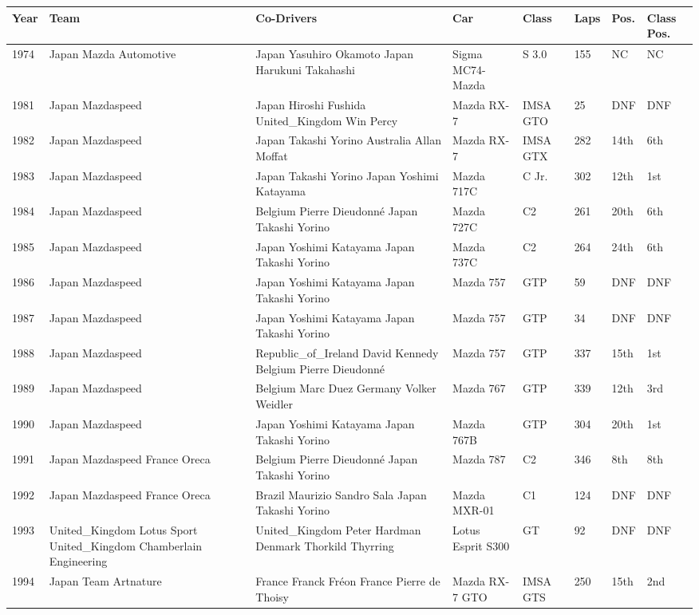 \documentclass{article}
\begin{document}
\begin{tabular}{llllllll}
\toprule
Year & Team & Co-Drivers & Car & Class & Laps & Pos. & Class Pos. \\
\midrule
1974 & Japan Mazda Automotive & Japan Yasuhiro Okamoto Japan Harukuni Takahashi & Sigma MC74-Mazda & S 3.0 & 155 & NC & NC \\
1981 & Japan Mazdaspeed & Japan Hiroshi Fushida United\_Kingdom Win Percy & Mazda RX-7 & IMSA GTO & 25 & DNF & DNF \\
1982 & Japan Mazdaspeed & Japan Takashi Yorino Australia Allan Moffat & Mazda RX-7 & IMSA GTX & 282 & 14th & 6th \\
1983 & Japan Mazdaspeed & Japan Takashi Yorino Japan Yoshimi Katayama & Mazda 717C & C Jr. & 302 & 12th & 1st \\
1984 & Japan Mazdaspeed & Belgium Pierre Dieudonné Japan Takashi Yorino & Mazda 727C & C2 & 261 & 20th & 6th \\
1985 & Japan Mazdaspeed & Japan Yoshimi Katayama Japan Takashi Yorino & Mazda 737C & C2 & 264 & 24th & 6th \\
1986 & Japan Mazdaspeed & Japan Yoshimi Katayama Japan Takashi Yorino & Mazda 757 & GTP & 59 & DNF & DNF \\
1987 & Japan Mazdaspeed & Japan Yoshimi Katayama Japan Takashi Yorino & Mazda 757 & GTP & 34 & DNF & DNF \\
1988 & Japan Mazdaspeed & Republic\_of\_Ireland David Kennedy Belgium Pierre Dieudonné & Mazda 757 & GTP & 337 & 15th & 1st \\
1989 & Japan Mazdaspeed & Belgium Marc Duez Germany Volker Weidler & Mazda 767 & GTP & 339 & 12th & 3rd \\
1990 & Japan Mazdaspeed & Japan Yoshimi Katayama Japan Takashi Yorino & Mazda 767B & GTP & 304 & 20th & 1st \\
1991 & Japan Mazdaspeed France Oreca & Belgium Pierre Dieudonné Japan Takashi Yorino & Mazda 787 & C2 & 346 & 8th & 8th \\
1992 & Japan Mazdaspeed France Oreca & Brazil Maurizio Sandro Sala Japan Takashi Yorino & Mazda MXR-01 & C1 & 124 & DNF & DNF \\
1993 & United\_Kingdom Lotus Sport United\_Kingdom Chamberlain Engineering & United\_Kingdom Peter Hardman Denmark Thorkild Thyrring & Lotus Esprit S300 & GT & 92 & DNF & DNF \\
1994 & Japan Team Artnature & France Franck Fréon France Pierre de Thoisy & Mazda RX-7 GTO & IMSA GTS & 250 & 15th & 2nd \\

\end{tabular}
\end{document}
